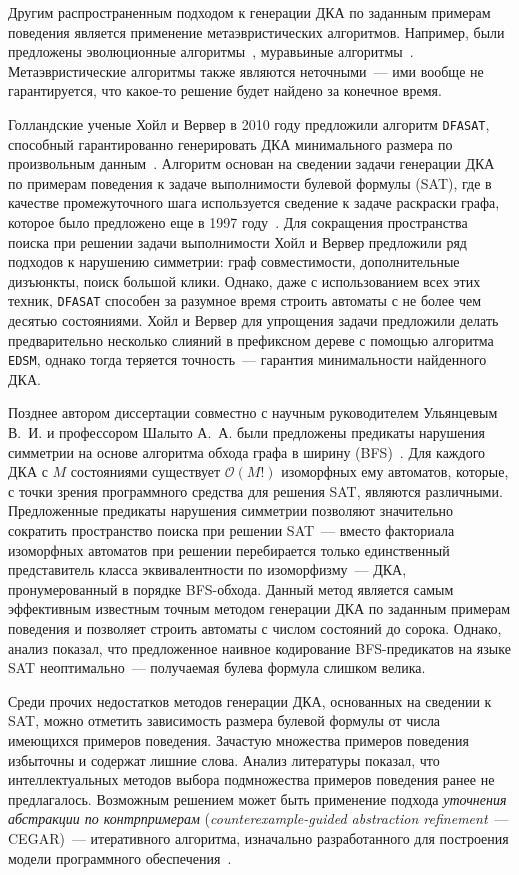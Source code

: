 Другим распространенным подходом к генерации ДКА по заданным примерам поведения является применение метаэвристических алгоритмов.
Например, были предложены эволюционные алгоритмы~\cite{DBLP:journals/pami/LucasR05,DBLP:conf/cec/Gomez06}, муравьиные алгоритмы~\cite{chivilikhin-12-ant}.
Метаэвристические алгоритмы также являются неточными~--- ими вообще не гарантируется, что какое-то решение будет найдено за конечное время.

Голландские ученые Хойл и Вервер в 2010 году предложили алгоритм \texttt{DFASAT}, способный гарантированно генерировать ДКА минимального размера по произвольным данным~\cite{heule-icgi10}.
Алгоритм основан на сведении задачи генерации ДКА по примерам поведения к задаче выполнимости булевой формулы (SAT), где в качестве промежуточного шага используется сведение к задаче раскраски графа, которое было предложено еще в 1997 году~\cite{Coste97regularinference}.
Для сокращения пространства поиска при решении задачи выполнимости Хойл и Вервер предложили ряд подходов к нарушению симметрии: граф совместимости, дополнительные дизъюнкты, поиск большой клики.
Однако, даже с использованием всех этих техник, \texttt{DFASAT} способен за разумное время строить автоматы с не более чем десятью состояниями.
Хойл и Вервер для упрощения задачи предложили делать предварительно несколько слияний в префиксном дереве с помощью алгоритма \texttt{EDSM}, однако тогда теряется точность~--- гарантия минимальности найденного ДКА.

Позднее автором диссертации совместно с научным руководителем Ульянцевым В.~И. и профессором Шалыто А.~А. были предложены предикаты нарушения симметрии на основе алгоритма обхода графа в ширину (BFS)~\cite{zakirzyanov2015LATA}.
Для каждого ДКА с $M$ состояниями существует $\mathcal{O}\left(M!\right)$ изоморфных ему автоматов, которые, с точки зрения программного средства для решения SAT, являются различными.
Предложенные предикаты нарушения симметрии позволяют значительно сократить пространство поиска при решении SAT~--- вместо факториала изоморфных автоматов при решении перебирается только единственный представитель класса эквивалентности по изоморфизму~--- ДКА, пронумерованный в порядке BFS-обхода.
Данный метод является самым эффективным известным точным методом генерации ДКА по заданным примерам поведения и позволяет строить автоматы с числом состояний до сорока.
Однако, анализ показал, что предложенное наивное кодирование BFS-предикатов на языке SAT неоптимально~--- получаемая булева формула слишком велика.

Среди прочих недостатков методов генерации ДКА, основанных на сведении к SAT, можно отметить зависимость размера булевой формулы от числа имеющихся примеров поведения.
Зачастую множества примеров поведения избыточны и содержат лишние слова.
Анализ литературы показал, что интеллектуальных методов выбора подмножества примеров поведения ранее не предлагалось.
Возможным решением может быть применение подхода \emph{уточнения абстракции по контрпримерам} (\emph{counterexample-guided abstraction refinement}~--- CEGAR)~--- итеративного алгоритма, изначально разработанного для построения модели программного обеспечения~\cite{DBLP:conf/cav/ClarkeGJLV00}.

